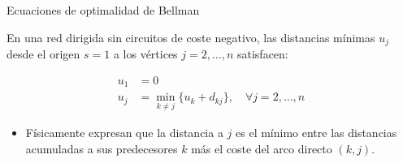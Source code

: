 \documentclass[
  ignorenonframetext,
]{beamer}
\providecommand{\tightlist}{%
  \setlength{\itemsep}{0pt}\setlength{\parskip}{0pt}}
\begin{document}
\begin{frame}{Ecuaciones de optimalidad de Bellman}
\label{ecuaciones-de-optimalidad-de-bellman-1}
\begin{tcolorbox}[enhanced jigsaw, colframe=quarto-callout-important-color-frame, toptitle=1mm, colback=white, colbacktitle=quarto-callout-important-color!10!white, titlerule=0mm, breakable, coltitle=black, opacityback=0, bottomrule=.15mm, title=\textcolor{quarto-callout-important-color}{\faExclamation}\hspace{0.5em}{Ecuaciones de optimalidad de Bellman}, rightrule=.15mm, arc=.35mm, leftrule=.75mm, left=2mm, toprule=.15mm, bottomtitle=1mm, opacitybacktitle=0.6]

En una red dirigida sin circuitos de coste negativo, las distancias
mínimas \(u_j\) desde el origen \(s = 1\) a los vértices
\(j = 2, \dots, n\) satisfacen:

\[
\begin{aligned}
u_1 &= 0 \\
u_j &= \min_{k \neq j} \{ u_k + d_{kj} \}, \quad \forall j = 2, \dots, n
\end{aligned}
\]

\end{tcolorbox}

\begin{itemize}
\tightlist
\item
  Físicamente expresan que la distancia a \(j\) es el mínimo entre las
  distancias acumuladas a sus predecesores \(k\) más el coste del arco
  directo \((k, j)\).
\end{itemize}
\end{frame}
\end{document}
